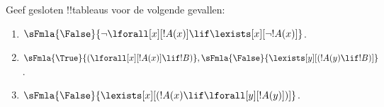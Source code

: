 \documentclass[../../../include/open-logic-section]{subfiles}
\begin{document}
\begin{prob}
Geef gesloten !!{tableau}s voor de volgende gevallen:
\begin{enumerate}
\item $\sFmla{\False}{\lnot\lforall[x][!A(x)] \lif \lexists[x][\lnot!A(x)]}$.
\item $\sFmla{\True}{(\lforall[x][!A(x)] \lif !B)}, \sFmla{\False}{\lexists[y][(!A(y) \lif !B)]}$.
\item $\sFmla{\False}{\lexists[x][(!A(x) \lif \lforall[y][!A(y)])]}$.
\end{enumerate}
\end{prob}
\end{document}
